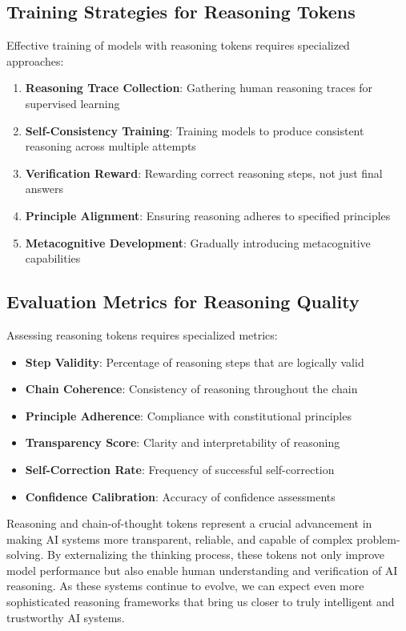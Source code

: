 \subsection{Training Strategies for Reasoning Tokens}

Effective training of models with reasoning tokens requires specialized approaches:

\begin{enumerate}
\item \textbf{Reasoning Trace Collection}: Gathering human reasoning traces for supervised learning
\item \textbf{Self-Consistency Training}: Training models to produce consistent reasoning across multiple attempts
\item \textbf{Verification Reward}: Rewarding correct reasoning steps, not just final answers
\item \textbf{Principle Alignment}: Ensuring reasoning adheres to specified principles
\item \textbf{Metacognitive Development}: Gradually introducing metacognitive capabilities
\end{enumerate}

\subsection{Evaluation Metrics for Reasoning Quality}

Assessing reasoning tokens requires specialized metrics:

\begin{itemize}
\item \textbf{Step Validity}: Percentage of reasoning steps that are logically valid
\item \textbf{Chain Coherence}: Consistency of reasoning throughout the chain
\item \textbf{Principle Adherence}: Compliance with constitutional principles
\item \textbf{Transparency Score}: Clarity and interpretability of reasoning
\item \textbf{Self-Correction Rate}: Frequency of successful self-correction
\item \textbf{Confidence Calibration}: Accuracy of confidence assessments
\end{itemize}

Reasoning and chain-of-thought tokens represent a crucial advancement in making AI systems more transparent, reliable, and capable of complex problem-solving. By externalizing the thinking process, these tokens not only improve model performance but also enable human understanding and verification of AI reasoning. As these systems continue to evolve, we can expect even more sophisticated reasoning frameworks that bring us closer to truly intelligent and trustworthy AI systems.